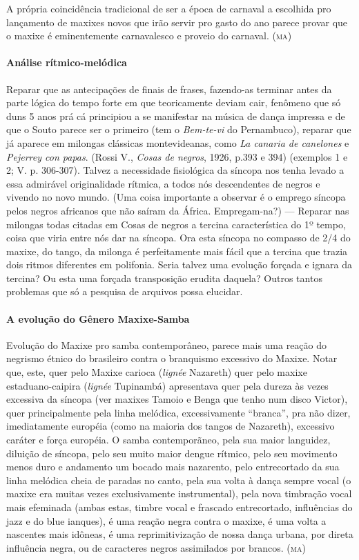 A própria coincidência tradicional de ser a época de carnaval a
escolhida pro lançamento de maxixes novos que irão servir pro gasto do
ano parece provar que o maxixe é eminentemente carnavalesco e proveio do
carnaval. (\textsc{ma})

\paragraph{Análise rítmico-melódica}

Reparar que as antecipações de finais de frases, fazendo-as terminar
antes da parte lógica do tempo forte em que teoricamente deviam cair,
fenômeno que só duns 5 anos prá cá principiou a se manifestar na música
de dança impressa e de que o Souto parece ser o primeiro (tem o
\emph{Bem-te-vi} do Pernambuco), reparar que já aparece em milongas
clássicas montevideanas, como \emph{La canaria de canelones} e
\emph{Pejerrey con papas}. (Rossi V., \emph{Cosas de negros}, 1926,
p.393 e 394) (exemplos 1 e 2; V. p. 306-307). Talvez a necessidade
fisiológica da síncopa nos tenha levado a essa admirável originalidade
rítmica, a todos nós descendentes de negros e vivendo no novo mundo.
(Uma coisa importante a observar é o emprego síncopa pelos negros
africanos que não saíram da África. Empregam-na?) --- Reparar nas milongas
todas citadas em Cosas de negros a tercina característica do 1º tempo,
coisa que viria entre nós dar na síncopa. Ora esta síncopa no compasso
de 2/4 do maxixe, do tango, da milonga é perfeitamente mais fácil que a
tercina que trazia dois ritmos diferentes em polifonia. Seria talvez uma
evolução forçada e ignara da tercina? Ou esta uma forçada transposição
erudita daquela? Outros tantos problemas que só a pesquisa de arquivos
possa elucidar.

\paragraph{A evolução do Gênero Maxixe-Samba}

Evolução do Maxixe pro samba contemporâneo, parece mais uma reação do
negrismo étnico do brasileiro contra o branquismo excessivo do Maxixe.
Notar que, este, quer pelo Maxixe carioca (\emph{lignée} Nazareth) quer
pelo maxixe estaduano-caipira (\emph{lignée} Tupinambá) apresentava quer
pela dureza às vezes excessiva da síncopa (ver maxixes Tamoio e Benga
que tenho num disco Victor), quer principalmente pela linha melódica,
excessivamente ``branca'', pra não dizer, imediatamente européia (como na
maioria dos tangos de Nazareth), excessivo caráter e força européia. O
samba contemporãneo, pela sua maior languidez, diluição de síncopa, pelo
seu muito maior dengue rítmico, pelo seu movimento menos duro e
andamento um bocado mais nazarento, pelo entrecortado da sua linha
melódica cheia de paradas no canto, pela sua volta à dança sempre vocal
(o maxixe era muitas vezes exclusivamente instrumental), pela nova
timbração vocal mais efeminada (ambas estas, timbre vocal e frascado
entrecortado, influências do jazz e do blue ianques), é uma reação negra
contra o maxixe, é uma volta a nascentes mais idôneas, é uma
reprimitivização de nossa dança urbana, por direta influência negra, ou
de caracteres negros assimilados por brancos. (\textsc{ma})

